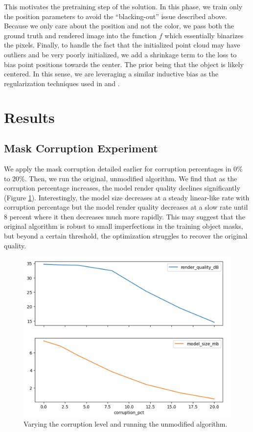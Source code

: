 \documentclass[10pt,twocolumn,letterpaper]{article}
\begin{document}
This motivates the pretraining step of the solution. In this phase, we train only the position parameters to avoid the ``blacking-out'' issue described above. Because we only care about the position and not the color, we pass both the ground truth and rendered image into the function $f$ which essentially binarizes the pixels. Finally, to handle the fact that the initialized point cloud may have outliers and be very poorly initialized, we add a shrinkage term to the loss to bias point positions towards the center. The prior being that the object is likely centered. In this sense, we are leveraging a similar inductive bias as the regularization techniques used in \cite{jain2022zeroshot} and \cite{yang2023freenerf}.

\section{Results}


\subsection{Mask Corruption Experiment}

We apply the mask corruption detailed earlier for corruption percentages in 0\% to 20\%. Then, we run the original, unmodified algorithm. We find that as the corruption percentage increases, the model render quality declines significantly (Figure \ref{fig:corruptionexperiment}). Interestingly, the model size decreases at a steady linear-like rate with corruption percentage but the model render quality decreases at a slow rate until 8 percent where it then decreases much more rapidly. This may suggest that the original algorithm is robust to small imperfections in the training object masks, but beyond a certain threshold, the optimization struggles to recover the original quality.

\begin{figure}[h]
\centering
    \includegraphics[width=0.9\linewidth]{figures/corruption-vs-quality-size.png}
    \caption{Varying the corruption level and running the unmodified algorithm. }
\label{fig:corruptionexperiment}
\end{figure}
\end{document}
